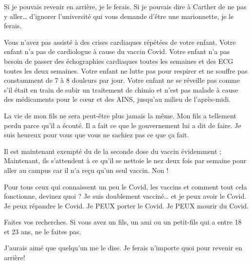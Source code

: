 Si je pouvais revenir en arrière, je le ferais. Si je pouvais dire à Carther de
ne pas y aller… d'ignorer l'université qui vous demande d'être une marionnette,
je le ferais.

Vous n'avez pas assisté à des crises cardiaques répétées de votre enfant. Votre
enfant n'a pas de cardiologue à cause du vaccin Covid. Votre enfant n'a pas
besoin de passer des échographies cardiaques toutes les semaines et des ECG
toutes les deux semaines. Votre enfant ne lutte pas pour respirer et ne souffre
pas constamment de 7 à 8 douleurs par jour. Votre enfant ne se réveille pas
comme s'il était en train de subir un traitement de chimio et n'est pas malade à
cause des médicaments pour le cœur et des AINS, jusqu'au milieu de l'après-midi.

La vie de mon fils ne sera peut-être plus jamais la même. Mon fils a tellement
perdu parce qu'il a écouté. Il a fait ce que le gouvernement lui a dit de
faire. Je suis heureux pour vous que vous ne sachiez pas ce que ça fait.

Il est maintenant exempté du de la seconde dose du vaccin évidemment ;
Maintenant, ils s'attendent à ce qu'il se nettoie le nez deux fois par semaine
pour aller au campus car il n'a reçu qu'un seul vaccin. Non !

Pour tous ceux qui connaissent un peu le Covid, les vaccins et comment tout cela
fonctionne, devinez quoi ? Je suis doublement vacciné… et je peux avoir le
Covid. Je peux répandre le Covid. Je PEUX porter le Covid. Je PEUX mourir du
Covid.

Faites vos recherches. Si vous avez un fils, un ami ou un petit-fils qui a entre
18 et 23 ans, ne le faites pas.

J'aurais aimé que quelqu'un me le dise. Je ferais n'importe quoi pour revenir en
arrière!
